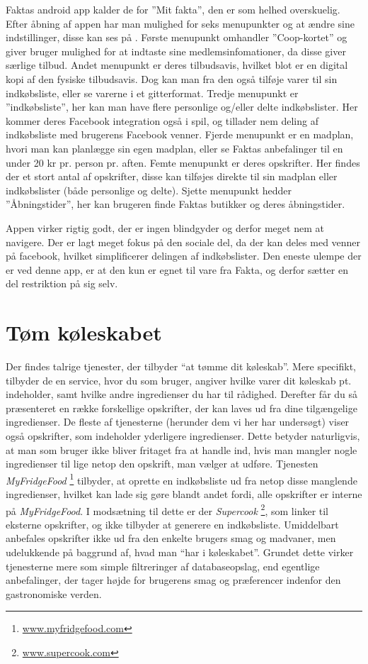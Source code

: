 Faktas android app kalder de for ''Mit fakta'', den er som helhed overskuelig.
Efter åbning af appen har man mulighed for seks menupunkter og at ændre sine indstillinger, disse kan ses på .
Første menupunkt omhandler ''Coop-kortet'' og giver bruger mulighed for at indtaste sine medlemsinfomationer, da disse giver særlige tilbud.
Andet menupunkt er deres tilbudsavis, hvilket blot er en digital kopi af den fysiske tilbudsavis. 
Dog kan man fra den også tilføje varer til sin indkøbsliste, eller se varerne i et gitterformat.
Tredje menupunkt er ''indkøbsliste'', her kan man have flere personlige og/eller delte indkøbslister.
Her kommer deres Facebook integration også i spil, og tillader nem deling af indkøbsliste med brugerens Facebook venner.
Fjerde menupunkt er en madplan, hvori man kan planlægge sin egen madplan, eller se Faktas anbefalinger til en under 20 kr pr. person pr. aften.
Femte menupunkt er deres opskrifter.
Her findes der et stort antal af opskrifter, disse kan tilføjes direkte til sin madplan eller indkøbslister (både personlige og delte).
Sjette menupunkt hedder ''Åbningstider'', her kan brugeren finde Faktas butikker og deres åbningstider. 

Appen virker rigtig godt, der er ingen blindgyder og derfor meget nem at navigere. Der er lagt meget fokus på den sociale del, da der kan deles med venner på facebook, hvilket simplificerer delingen af indkøbslister. Den eneste ulempe der er ved denne app, er at den kun er egnet til vare fra Fakta, og derfor sætter en del restriktion på sig selv.


\section{Tøm køleskabet}
Der findes talrige tjenester, der tilbyder “at tømme dit køleskab”. 
Mere specifikt, tilbyder de en service, hvor du som bruger, angiver hvilke varer dit køleskab pt. indeholder, samt hvilke andre ingredienser du har til rådighed. 
Derefter får du så præsenteret en række forskellige opskrifter, der kan laves ud fra dine tilgængelige ingredienser. 
De fleste af tjenesterne (herunder dem vi her har undersøgt) viser også opskrifter, som indeholder yderligere ingredienser. 
Dette betyder naturligvis, at man som bruger ikke bliver fritaget fra at handle ind, hvis man mangler nogle ingredienser til lige netop den opskrift, man vælger at udføre. 
Tjenesten \textit{MyFridgeFood} \footnote{\underline{www.myfridgefood.com}} tilbyder, at oprette en indkøbsliste ud fra netop disse manglende ingredienser, hvilket kan lade sig gøre blandt andet fordi, alle opskrifter er interne på \textit{MyFridgeFood}. 
I modsætning til dette er der \textit{Supercook} \footnote{\underline{www.supercook.com}}, som linker til eksterne opskrifter, og ikke tilbyder at generere en indkøbsliste. 
Umiddelbart anbefales opskrifter ikke ud fra den enkelte brugers smag og madvaner, men udelukkende på baggrund af, hvad man “har i køleskabet”. 
Grundet dette virker tjenesterne mere som simple filtreringer af databaseopslag, end egentlige anbefalinger, der tager højde for brugerens smag og præferencer indenfor den gastronomiske verden.

